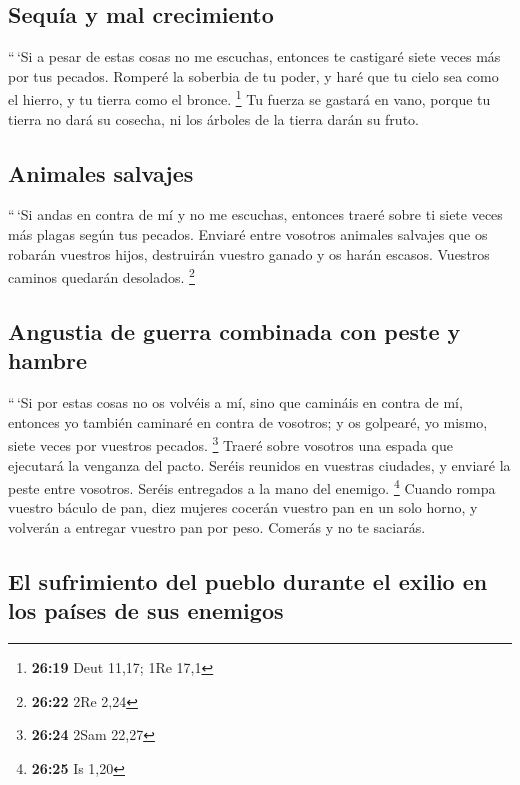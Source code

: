 \hypertarget{sequuxeda-y-mal-crecimiento}{%
\subsection{Sequía y mal
crecimiento}\label{sequuxeda-y-mal-crecimiento}}

 ``\,`Si a pesar de estas cosas no me escuchas, entonces
te castigaré siete veces más por tus pecados.  Romperé la
soberbia de tu poder, y haré que tu cielo sea como el hierro, y tu
tierra como el bronce. \footnote{\textbf{26:19} Deut 11,17; 1Re 17,1}
 Tu fuerza se gastará en vano, porque tu tierra no dará
su cosecha, ni los árboles de la tierra darán su fruto.

\hypertarget{animales-salvajes}{%
\subsection{Animales salvajes}\label{animales-salvajes}}

 ``\,`Si andas en contra de mí y no me escuchas, entonces
traeré sobre ti siete veces más plagas según tus pecados.
 Enviaré entre vosotros animales salvajes que os robarán
vuestros hijos, destruirán vuestro ganado y os harán escasos. Vuestros
caminos quedarán desolados. \footnote{\textbf{26:22} 2Re 2,24}

\hypertarget{angustia-de-guerra-combinada-con-peste-y-hambre}{%
\subsection{Angustia de guerra combinada con peste y
hambre}\label{angustia-de-guerra-combinada-con-peste-y-hambre}}

 ``\,`Si por estas cosas no os volvéis a mí, sino que
camináis en contra de mí,  entonces yo también caminaré
en contra de vosotros; y os golpearé, yo mismo, siete veces por vuestros
pecados. \footnote{\textbf{26:24} 2Sam 22,27}  Traeré
sobre vosotros una espada que ejecutará la venganza del pacto. Seréis
reunidos en vuestras ciudades, y enviaré la peste entre vosotros. Seréis
entregados a la mano del enemigo. \footnote{\textbf{26:25} Is 1,20}
 Cuando rompa vuestro báculo de pan, diez mujeres cocerán
vuestro pan en un solo horno, y volverán a entregar vuestro pan por
peso. Comerás y no te saciarás.

\hypertarget{el-sufrimiento-del-pueblo-durante-el-exilio-en-los-pauxedses-de-sus-enemigos}{%
\subsection{El sufrimiento del pueblo durante el exilio en los países de
sus
enemigos}\label{el-sufrimiento-del-pueblo-durante-el-exilio-en-los-pauxedses-de-sus-enemigos}}

